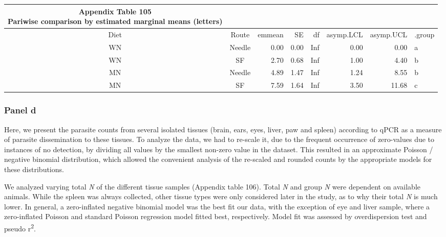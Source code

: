 \documentclass[
  12pt,
  letterpaper,
]{article}
\begin{document}
\begingroup
\fontsize{12.0pt}{14.4pt}\selectfont
\begin{longtable}{ccrrrrrl}
\caption*{
{\large \textbf{Appendix Table 105}} \\ 
{\small \textbf{Pariwise comparison by estimated marginal means (letters)}}
} \\ 
\toprule
{Diet} & {Route} & {emmean} & {SE} & {df} & {asymp.LCL} & {asymp.UCL} & {.group} \\ 
\midrule\addlinespace[2.5pt]
WN & Needle & 0.00 & 0.00 & Inf & 0.00 & 0.00 &  a   \\ 
WN & SF & 2.70 & 0.68 & Inf & 1.00 & 4.40 &   b  \\ 
MN & Needle & 4.89 & 1.47 & Inf & 1.24 & 8.55 &   b  \\ 
MN & SF & 7.59 & 1.64 & Inf & 3.50 & 11.68 &    c \\ 
\bottomrule
\end{longtable}
\endgroup

\subsubsection{Panel d}\label{panel-d-1}

Here, we present the parasite counts from several isolated tissues (brain, ears, eyes, liver, paw and spleen) according to qPCR as a measure of parasite dissemination to these tissues. To analyze the data, we had to re-scale it, due to the frequent occurrence of zero-values due to instances of no detection, by dividing all values by the smallest non-zero value in the dataset. This resulted in an approximate Poisson / negative binomial distribution, which allowed the convenient analysis of the re-scaled and rounded counts by the appropriate models for these distributions.

We analyzed varying total \emph{N} of the different tissue samples (Appendix table 106). Total \emph{N} and group \emph{N} were dependent on available animals. While the spleen was always collected, other tissue types were only considered later in the study, as to why their total \emph{N} is much lower. In general, a zero-inflated negative binomial model was the best fit our data, with the exception of eye and liver sample, where a zero-inflated Poisson and standard Poisson regression model fitted best, respectively. Model fit was assessed by overdispersion test and pseudo r\textsuperscript{2}.
\end{document}
